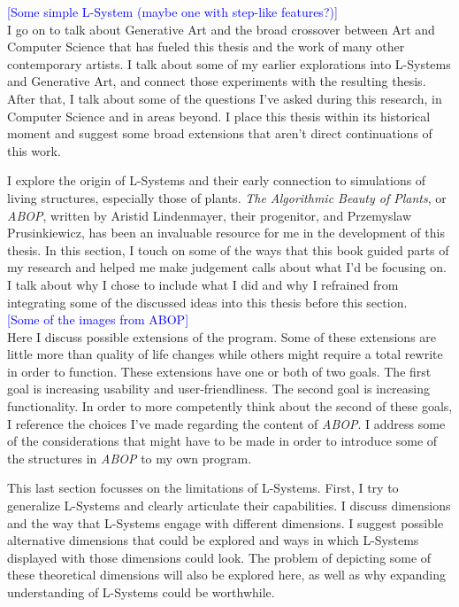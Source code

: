 \documentclass[12pt,twoside]{reedthesis}
\begin{document}
	\textcolor{blue}{[Some simple L-System (maybe one with step-like features?)]}\\
	
	I go on to talk about Generative Art and the broad crossover between Art and Computer Science that has fueled this thesis and the work of many other contemporary artists. I talk about some of my earlier explorations into L-Systems and Generative Art, and connect those experiments with the resulting thesis. After that, I talk about some of the questions I've asked during this research, in Computer Science and in areas beyond. I place this thesis within its historical moment and suggest some broad extensions that aren't direct continuations of this work.
	
	I explore the origin of L-Systems and their early connection to simulations of living structures, especially those of plants. \textit{The Algorithmic Beauty of Plants}, or \textit{ABOP}, written by Aristid Lindenmayer, their progenitor, and Przemyslaw Prusinkiewicz, has been an invaluable resource for me in the development of this thesis. In this section, I touch on some of the ways that this book guided parts of my research and helped me make judgement calls about what I'd be focusing on. I talk about why I chose to include what I did and why I refrained from integrating some of the discussed ideas into this thesis before this section.\\
	
	\textcolor{blue}{[Some of the images from ABOP]}\\
	
	Here I discuss possible extensions of the program. Some of these extensions are little more than quality of life changes while others might require a total rewrite in order to function. These extensions have one or both of two goals. The first goal is increasing usability and user-friendliness. The second goal is increasing functionality. In order to more competently think about the second of these goals, I reference the choices I've made regarding the content of \textit{ABOP}. I address some of the considerations that might have to be made in order to introduce some of the structures in \textit{ABOP} to my own program.
	
	This last section focusses on the limitations of L-Systems. First, I try to generalize L-Systems and clearly articulate their capabilities. I discuss dimensions and the way that L-Systems engage with different dimensions. I suggest possible alternative dimensions that could be explored and ways in which L-Systems displayed with those dimensions could look. The problem of depicting some of these theoretical dimensions will also be explored here, as well as why expanding understanding of L-Systems could be worthwhile.
	
\end{document}
